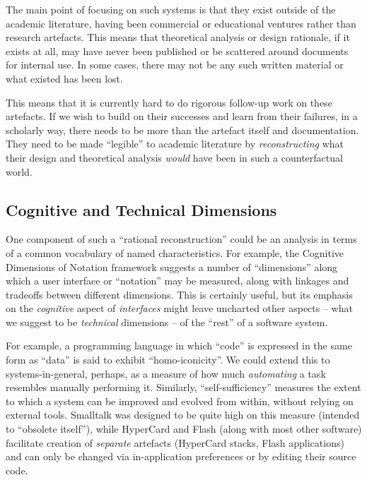 The main point of focusing on such systems is that they exist outside of
the academic literature, having been commercial or educational ventures
rather than research artefacts. This means that theoretical analysis or
design rationale, if it exists at all, may have never been published or
be scattered around documents for internal use. In some cases, there may
not be any such written material or what existed has been lost.

This means that it is currently hard to do rigorous follow-up work on
these artefacts. If we wish to build on their successes and learn from
their failures, in a scholarly way, there needs to be more than the
artefact itself and documentation. They need to be made ``legible'' to
academic literature by \emph{reconstructing} what their design and
theoretical analysis \emph{would} have been in such a counterfactual
world.

\hypertarget{cognitive-and-technical-dimensions}{%
\subsection{Cognitive and Technical
Dimensions}\label{cognitive-and-technical-dimensions}}

One component of such a ``rational reconstruction'' could be an analysis
in terms of a common vocabulary of named characteristics. For example,
the Cognitive Dimensions of Notation framework \cite{cogdims} suggests a
number of ``dimensions'' along which a user interface or ``notation''
may be measured, along with linkages and tradeoffs between different
dimensions. This is certainly useful, but its emphasis on the
\emph{cognitive} aspect of \emph{interfaces} might leave uncharted other
aspects -- what we suggest to be \emph{technical} dimensions -- of the
``rest'' of a software system.

For example, a programming language in which ``code'' is expressed in
the same form as ``data'' is said to exhibit ``homo-iconicity''. We
could extend this to systems-in-general, perhaps, as a measure of how
much \emph{automating} a task resembles manually performing it.
Similarly, ``self-sufficiency'' measures the extent to which a system
can be improved and evolved from within, without relying on external
tools. Smalltalk was designed to be quite high on this measure (intended
to ``obsolete itself''), while HyperCard and Flash (along with most
other software) facilitate creation of \emph{separate} artefacts
(HyperCard stacks, Flash applications) and can only be changed via
in-application preferences or by editing their source code.

